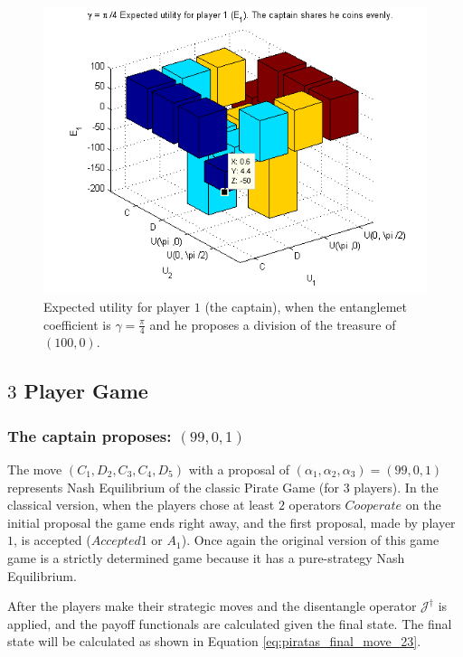 \documentclass[10pt,twocolumn]{llncs}
\begin{document}
\begin{figure}[h!]
\centering 
\includegraphics[scale=0.60]{Figures/1.5qubit/piadividirpor4.png}
\caption{Expected utility for player $1$ (the captain), when the entanglemet coefficient is $\gamma=\frac{\pi}{4}$ and he proposes a division of the treasure of $(100,0)$.}
\label{fig:pg_2players_99_0_1:33jesus}
\end{figure}

\subsection{$3$ Player Game}
\label{subsec:3playergame}


\subsubsection{The captain proposes: $(99, 0, 1)$}
\label{subsubsec:3playergame99}

The move $(C_1,D_2,C_3,C_4,D_5)$ with a proposal of $(\alpha_{1}, \alpha_{2}, \alpha_{3}) =(99, 0, 1)$ represents Nash Equilibrium of the classic Pirate Game (for $3$ players). In the classical version, when the players chose at least $2$ operators $Cooperate$ on the initial proposal the game ends right away, and the first proposal, made by player $1$, is accepted ($Accepted 1$ or $A_{1}$). Once again the original version of this game game is a strictly determined game because it has a pure-strategy Nash Equilibrium.

After the players make their strategic moves and the disentangle operator $\mathcal{J}^{\dagger}$ is applied, and the payoff functionals are calculated given the final state. The final state will be calculated as shown in Equation \eqref{eq:piratas_final_move_23}.
\end{document}
